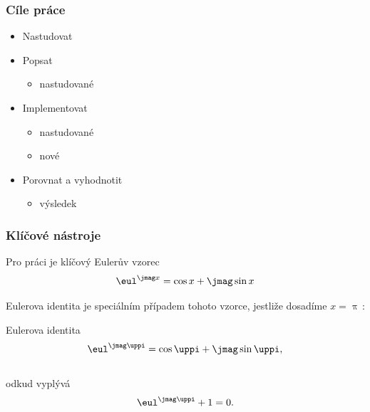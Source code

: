 \documentclass[%
  12pt,       				%
	t,                  %
	aspectratio=1610,   %
	unicode,						%
]{beamer}				    	%
\begin{document}
\disablenavigationsymbols%

\maketitle%

\begin{frame}
	\frametitle{Cíle práce}
	\begin{itemize}
		\item Nastudovat
		\item Popsat
		      \begin{itemize}
			      \item nastudované
		      \end{itemize}
		\item Implementovat
		      \begin{itemize}
			      \item nastudované
			      \item nové
		      \end{itemize}
		\item Porovnat a vyhodnotit
		      \begin{itemize}
			      \item výsledek
		      \end{itemize}
	\end{itemize}
\end{frame}


\begin{frame}
	\frametitle{Klíčové nástroje}

	\begin{alertblock}{Pro práci je klíčový Eulerův vzorec}
		$$\eul^{\jmag x}=\cos x + \jmag\sin x$$
	\end{alertblock}

	\vspace{4ex}
	Eulerova identita je speciálním případem tohoto vzorce, jestliže dosadíme $x=\uppi$\,:

	\begin{block}{Eulerova identita}
		$$\eul^{\jmag \uppi}=\cos \uppi + \jmag\sin \uppi,$$\\
		odkud vyplývá
		$$\eul^{\jmag \uppi}+1=0.$$
	\end{block}
\end{frame}
\end{document}
